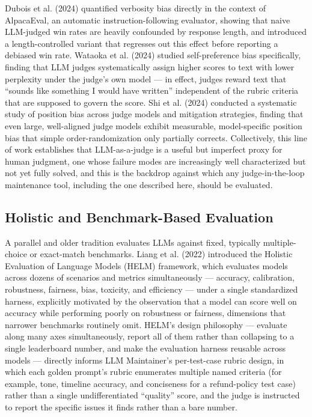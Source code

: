 \documentclass[11pt,a4paper]{article}
\begin{document}
Dubois et al. (2024) quantified verbosity bias directly in the context
of AlpacaEval, an automatic instruction-following evaluator, showing
that naive LLM-judged win rates are heavily confounded by response
length, and introduced a length-controlled variant that regresses out
this effect before reporting a debiased win rate. Wataoka et al. (2024)
studied self-preference bias specifically, finding that LLM judges
systematically assign higher scores to text with lower perplexity under
the judge's own model --- in effect, judges reward text
that ``sounds like something I would have written'' independent of the
rubric criteria that are supposed to govern the score. Shi et al. (2024)
conducted a systematic study of position bias across judge models and
mitigation strategies, finding that even large, well-aligned judge
models exhibit measurable, model-specific position bias that simple
order-randomization only partially corrects. Collectively, this line of
work establishes that LLM-as-a-judge is a useful but imperfect proxy for
human judgment, one whose failure modes are increasingly well
characterized but not yet fully solved, and this is the backdrop against
which any judge-in-the-loop maintenance tool, including the one
described here, should be evaluated.

\subsection{Holistic and Benchmark-Based Evaluation}

A parallel and older tradition evaluates LLMs against fixed, typically
multiple-choice or exact-match benchmarks. Liang et al. (2022)
introduced the Holistic Evaluation of Language Models (HELM) framework,
which evaluates models across dozens of scenarios and metrics
simultaneously --- accuracy, calibration, robustness, fairness, bias,
toxicity, and efficiency --- under a single standardized harness,
explicitly motivated by the observation that a model can score well on
accuracy while performing poorly on robustness or fairness, dimensions
that narrower benchmarks routinely omit. HELM's design
philosophy --- evaluate along many axes simultaneously, report all of
them rather than collapsing to a single leaderboard number, and make the
evaluation harness reusable across models --- directly informs LLM
Maintainer's per-test-case rubric design, in which each
golden prompt's rubric enumerates multiple named
criteria (for example, tone, timeline accuracy, and conciseness for a
refund-policy test case) rather than a single undifferentiated ``quality''
score, and the judge is instructed to report the specific issues it
finds rather than a bare number.
\end{document}
